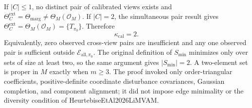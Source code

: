 If \(\lvert C\rvert\le1\), no distinct pair of calibrated views exists and \(\Theta_C^{\mathrm{ext}}=\Theta_{\mathrm{marg}}\ne\Theta_M(\mathcal O_M)\).  If \(\lvert C\rvert=2\), the simultaneous pair result gives \(\Theta_C^{\mathrm{ext}}=\Theta_M(\mathcal O_M)=\{T_{\pi_0}\}\).  Therefore
\[
\kappa_{\mathrm{cal}}=2.
\]
Equivalently, zero observed cross-view pairs are insufficient and any one observed pair is sufficient outside \(\mathcal E_{\mathrm{all},\pi_0}\).  The original definition of \(S_{\min}\) minimizes only over sets of size at least two, so the same argument gives \(\lvert S_{\min}\rvert=2\).  A two-element set is proper in \(M\) exactly when \(m\ge3\).  The proof invoked only order-triangular coefficients, positive-definite coordinate disturbance covariances, Gaussian completion, and component alignment; it did not impose edge minimality or the diversity condition of HeurtebiseEtAl2026LiMVAM.
